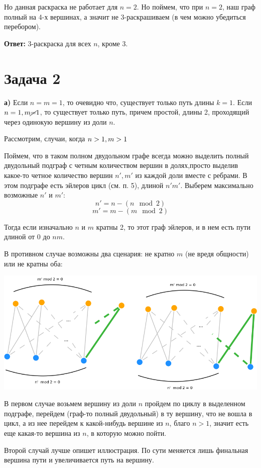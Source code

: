 \documentclass{article}
\begin{document}
	Но данная раскраска не работает для $n = 2$. Но поймем, что при $n = 2$, наш граф полный на 4-х вершинах, а значит не 3-раскрашиваем (в чем можно убедиться перебором).
	
	\textbf{Ответ:} 3-раскраска для всех $n$, кроме 3.
	
\section{Задача 2}
\textbf{а)}	Если $n = m = 1$, то очевидно что, существует только путь длины $k=1$. Если $n=1, \space m \cancel{=} 1$, то существует только путь, причем простой, длины 2, проходящий через одинокую вершину из доли $n$.

Рассмотрим, случаи, когда $n > 1, \space m > 1$

Поймем, что в таком полном двудольном графе всегда можно выделить полный двудольный подграф с четным количеством вершин в долях,просто выделив какое-то четное количество вершин $n', m'$ из каждой доли вместе с ребрами. В этом подграфе есть эйлеров цикл (см. п. 5), длиной $n'm'$. Выберем максимально возможные $n'$ и $m'$: 
$$n' = n - (n\mod 2)$$
$$m' = m - (m\mod 2)$$

Тогда если изначально $n$ и $m$  кратны 2, то этот граф эйлеров, и в нем есть пути длиной от $0$ до $nm$.

В противном случае возможны два сценария: не кратно $m$ (не вредя общности) или не кратны оба:
\begin{center}
\includegraphics[scale=0.44]{2_1}
\end{center}
В первом случае возьмем вершину из доли $n$ пройдем по циклу в выделенном подграфе, перейдем (граф-то полный двудольный) в ту вершину, что не вошла в цикл, а из нее перейдем к какой-нибудь вершине из $n$, благо $n > 1$, значит есть еще какая-то вершина из $n$, в которую можно пойти.

Второй случай лучше опишет иллюстрация. По сути меняется лишь финальная вершина пути и увеличивается путь на вершину. 
\end{document}
